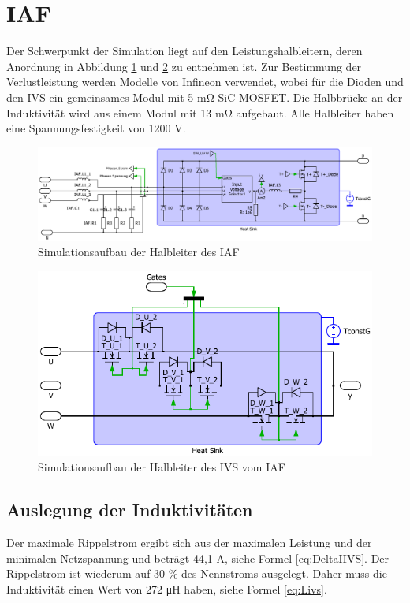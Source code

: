\section{IAF}
	Der Schwerpunkt der Simulation liegt auf den Leistungshalbleitern, deren Anordnung in Abbildung \ref{fig:iafplecsmain} und \ref{fig:iafplecsivs} zu entnehmen ist. Zur Bestimmung der Verlustleistung werden Modelle von Infineon verwendet, wobei für die Dioden und den \gls{IVS} ein gemeinsames Modul mit 5 \si{\milli \ohm} \gls{SiC} \gls{MOSFET}. Die Halbbrücke an der Induktivität wird aus einem Modul mit 13 \si{\milli \ohm} aufgebaut. Alle Halbleiter haben eine Spannungsfestigkeit von 1200 V.
	\begin{figure}
		\centering
		\includegraphics[width=1\linewidth]{content/Grafiken/IAF_Plecs_main}
		\caption{Simulationsaufbau der Halbleiter des IAF}
		\label{fig:iafplecsmain}
	\end{figure}
	\begin{figure}
		\centering
		\includegraphics[width=1\linewidth]{content/Grafiken/IAF_Plecs_IVS}
		\caption{Simulationsaufbau der Halbleiter des IVS vom IAF}
		\label{fig:iafplecsivs}
	\end{figure}
	

	\subsection{Auslegung der Induktivitäten}
	Der maximale Rippelstrom ergibt sich aus der maximalen Leistung und der minimalen Netzspannung und beträgt 44,1 \si{\A}, siehe Formel \ref{eq:DeltaIIVS}. Der Rippelstrom ist wiederum auf 30 \% des Nennstroms ausgelegt. Daher muss die Induktivität einen Wert von 272 \si{\micro \henry} haben, siehe Formel \ref{eq:Livs}. 
		
